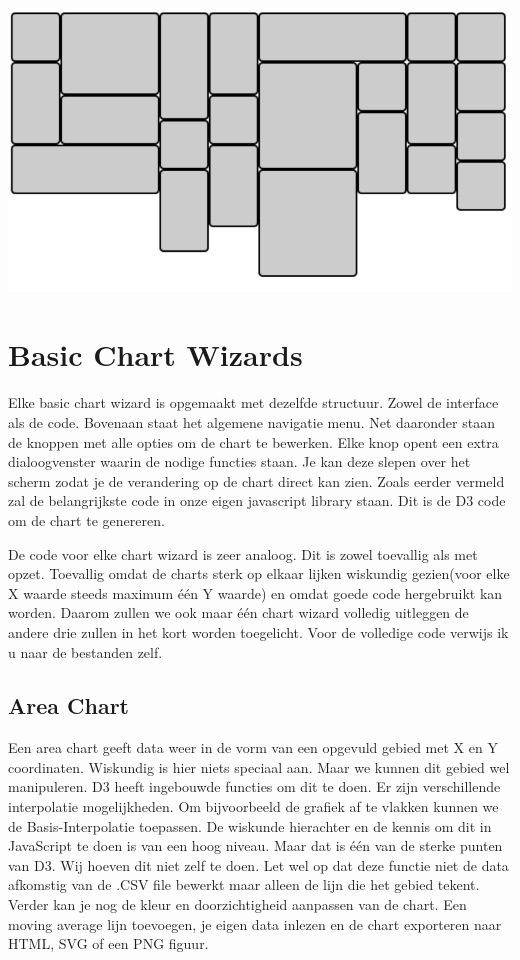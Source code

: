 \begin{center}
  \includegraphics[]{figures/chap2/masonry.png}
\end{center}

\section{Basic Chart Wizards}

Elke basic chart wizard is opgemaakt met dezelfde structuur. Zowel de interface als de code.
Bovenaan staat het algemene navigatie menu. Net daaronder staan de knoppen met alle opties om de chart te bewerken. Elke knop opent een extra dialoogvenster waarin de nodige functies staan. Je kan deze slepen over het scherm zodat je de verandering op de chart direct kan zien. Zoals eerder vermeld zal de belangrijkste code in onze eigen javascript library staan. Dit is de D3 code om de chart te genereren.

De code voor elke chart wizard is zeer analoog. Dit is zowel toevallig als met opzet. Toevallig omdat de charts sterk op elkaar lijken wiskundig gezien(voor elke X waarde steeds maximum \'e\'en Y waarde) en omdat goede code hergebruikt kan worden. Daarom zullen we ook maar \'e\'en chart wizard volledig uitleggen de andere drie zullen in het kort worden toegelicht. Voor de volledige code verwijs ik u naar de bestanden zelf.

\subsection{Area Chart}

Een area chart geeft data weer in de vorm van een opgevuld gebied met X en Y coordinaten. Wiskundig is hier niets speciaal aan. Maar we kunnen dit gebied wel manipuleren. D3 heeft ingebouwde functies om dit te doen. Er zijn verschillende interpolatie mogelijkheden. Om bijvoorbeeld de grafiek af te vlakken kunnen we de Basis-Interpolatie toepassen. De wiskunde hierachter en de kennis om dit in JavaScript te doen is van een hoog niveau. Maar dat is \'e\'en van de sterke punten van D3. Wij hoeven dit niet zelf te doen. Let wel op dat deze functie niet de data afkomstig van de .CSV file bewerkt maar alleen de lijn die het gebied tekent. Verder kan je nog de kleur en doorzichtigheid aanpassen van de chart. Een moving average lijn toevoegen, je eigen data inlezen en de chart exporteren naar HTML, SVG of een PNG figuur.

